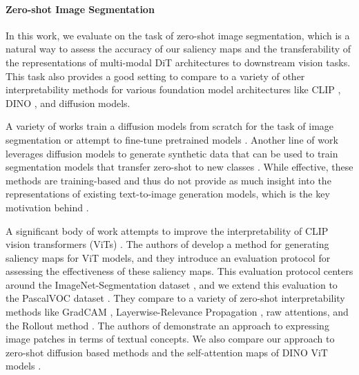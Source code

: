 

\paragraph{Zero-shot Image Segmentation}
In this work, we evaluate \tool{} on the task of zero-shot image segmentation, which is a natural way to assess the accuracy of our saliency maps and the transferability of the representations of multi-modal DiT architectures to downstream vision tasks. This task also provides a good setting to compare to a variety of other interpretability methods for various foundation model architectures like CLIP \cite{radford_learning_2021}, DINO \cite{caron_emerging_2021}, and diffusion models.  

A variety of works train a diffusion models from scratch for the task of image segmentation \cite{amit_segdiff_2022, karazija_diffusion_2024} or attempt to fine-tune pretrained models \cite{baranchuk_label-efficient_2022}. Another line of work leverages diffusion models to generate synthetic data that can be used to train segmentation models that transfer zero-shot to new classes \cite{li_open-vocabulary_2023}. While effective, these methods are training-based and thus do not provide as much insight into the representations of existing text-to-image generation models, which is the key motivation behind \tool{}. 

A significant body of work attempts to improve the interpretability of CLIP vision transformers (ViTs) \cite{dosovitskiy_image_2021}. The authors of \cite{chefer_transformer_2021} develop a method for generating saliency maps for ViT models, and they introduce an evaluation protocol for assessing the effectiveness of these saliency maps. This evaluation protocol centers around the ImageNet-Segmentation dataset \cite{guillaumin_imagenet_2014}, and we extend this evaluation to the PascalVOC dataset \cite{everingham_pascal_2015}. They compare to a variety of zero-shot interpretability methods like GradCAM \cite{selvaraju_grad-cam_2019}, Layerwise-Relevance Propagation \cite{binder_layer-wise_2016}, raw attentions, and the Rollout method \cite{abnar_quantifying_2020}. The authors of \cite{gandelsman_interpreting_2024} demonstrate an approach to expressing image patches in terms of textual concepts. We also compare our approach to zero-shot diffusion based methods \cite{tang_what_2022, wang_diffusion_2024} and the self-attention maps of DINO ViT models \cite{caron_emerging_2021}. 

